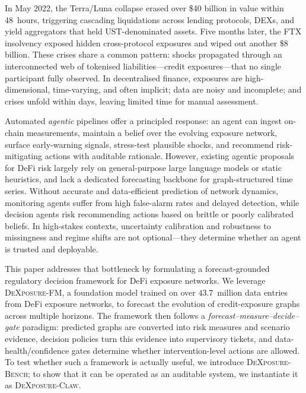 
In May 2022, the Terra/Luna collapse erased over \$40 billion in value within 48~hours, triggering cascading liquidations across lending protocols, DEXs, and yield aggregators that held UST-denominated assets. Five months later, the FTX insolvency exposed hidden cross-protocol exposures and wiped out another \$8 billion. These crises share a common pattern: shocks propagated through an interconnected web of tokenised liabilities---credit exposures---that no single participant fully observed. In decentralised finance, exposures are high-dimensional, time-varying, and often implicit; data are noisy and incomplete; and crises unfold within days, leaving limited time for manual assessment.

Automated \emph{agentic} pipelines offer a principled response: an agent can ingest on-chain measurements, maintain a belief over the evolving exposure network, surface early-warning signals, stress-test plausible shocks, and recommend risk-mitigating actions with auditable rationale. However, existing agentic proposals for DeFi risk largely rely on general-purpose large language models or static heuristics, and lack a dedicated forecasting backbone for graph-structured time series. Without accurate and data-efficient prediction of network dynamics, monitoring agents suffer from high false-alarm rates and delayed detection, while decision agents risk recommending actions based on brittle or poorly calibrated beliefs. In high-stakes contexts, uncertainty calibration and robustness to missingness and regime shifts are not optional---they determine whether an agent is trusted and deployable.

This paper addresses that bottleneck by formulating a forecast-grounded regulatory decision framework for DeFi exposure networks. We leverage \textsc{DeXposure-FM}, a foundation model trained on over $43.7$~million data entries from DeFi exposure networks, to forecast the evolution of credit-exposure graphs across multiple horizons. The framework then follows a \emph{forecast--measure--decide--gate} paradigm: predicted graphs are converted into risk measures and scenario evidence, decision policies turn this evidence into supervisory tickets, and data-health/confidence gates determine whether intervention-level actions are allowed. To test whether such a framework is actually useful, we introduce \textsc{DeXposure-Bench}; to show that it can be operated as an auditable system, we instantiate it as \textsc{DeXposure-Claw}.

